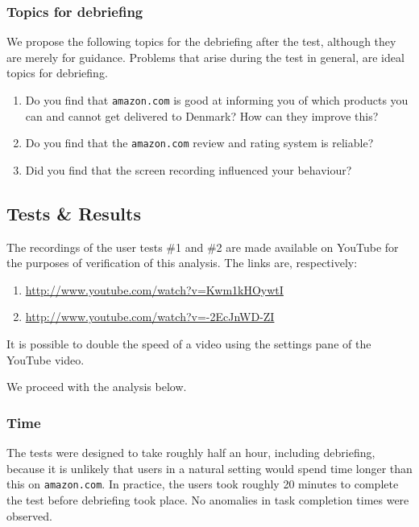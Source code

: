 \subsubsection{Topics for debriefing}

We propose the following topics for the debriefing after the test, although
they are merely for guidance. Problems that arise during the test in general,
are ideal topics for debriefing.

\begin{enumerate}

\item Do you find that \texttt{amazon.com} is good at informing you of which
products you can and cannot get delivered to Denmark? How can they improve
this?

\item Do you find that the \texttt{amazon.com} review and rating system is
reliable?

\item Did you find that the screen recording influenced your behaviour?

\end{enumerate}

\subsection{Tests \& Results}

The recordings of the user tests \#1 and \#2 are made available on YouTube for
the purposes of verification of this analysis. The links are, respectively:

\begin{enumerate}

\item \url{http://www.youtube.com/watch?v=Kwm1kHOywtI}

\item \url{http://www.youtube.com/watch?v=-2EcJnWD-ZI}

\end{enumerate}

It is possible to double the speed of a video using the settings pane of the
YouTube video.

We proceed with the analysis below.

\subsubsection{Time}

The tests were designed to take roughly half an hour, including debriefing,
because it is unlikely that users in a natural setting would spend time longer
than this on \texttt{amazon.com}. In practice, the users took roughly 20
minutes to complete the test before debriefing took place. No anomalies in task
completion times were observed.


